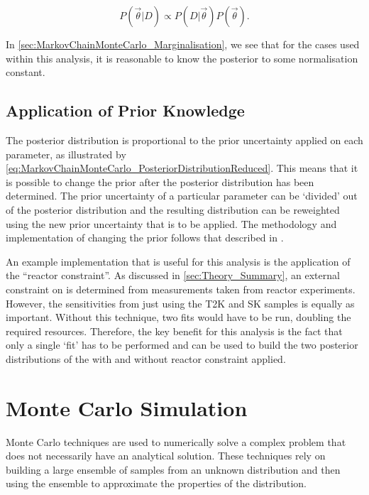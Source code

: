 \begin{equation}
  \label{eq:MarkovChainMonteCarlo_PosteriorDistributionReduced}
  P(\vec{\theta}|D) \propto P(D|\vec{\theta}) P(\vec{\theta}).
\end{equation}

In \autoref{sec:MarkovChainMonteCarlo_Marginalisation}, we see that for the cases used within this analysis, it is reasonable to know the posterior to some normalisation constant.

\subsection{Application of Prior Knowledge}
\label{sec:MarkovChainMonteCarlo_Priors}

The posterior distribution is proportional to the prior uncertainty applied on each parameter, as illustrated by \autoref{eq:MarkovChainMonteCarlo_PosteriorDistributionReduced}. This means that it is possible to change the prior after the posterior distribution has been determined. The prior uncertainty of a particular parameter can be `divided' out of the posterior distribution and the resulting distribution can be reweighted using the new prior uncertainty that is to be applied. The methodology and implementation of changing the prior follows that described in \cite{thesis_artur}. 

An example implementation that is useful for this analysis is the application of the ``reactor constraint''. As discussed in \autoref{sec:Theory_Summary}, an external constraint on  is determined from measurements taken from reactor experiments. However, the sensitivities from just using the T2K and SK samples is equally as important. Without this technique, two fits would have to be run, doubling the required resources. Therefore, the key benefit for this analysis is the fact that only a single `fit' has to be performed and can be used to build the two posterior distributions of the with and without reactor constraint applied.

\section{Monte Carlo Simulation}
\label{sec:MarkovChainMonteCarlo_MonteCarloSimulation}
Monte Carlo techniques are used to numerically solve a complex problem that does not necessarily have an analytical solution. These techniques rely on building a large ensemble of samples from an unknown distribution and then using the ensemble to approximate the properties of the distribution.


